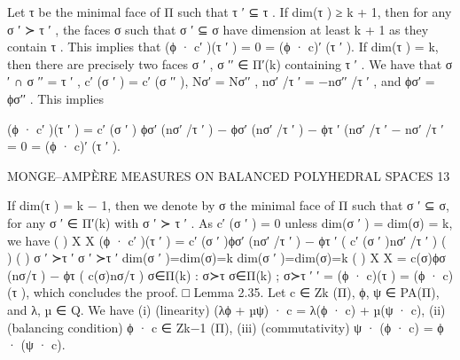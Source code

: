 \documentclass[
  11pt,
]{article}
\newenvironment{Shaded}{}{}
\newcommand{\NormalTok}[1]{#1}
\begin{document}
\begin{Shaded}
\begin{Highlighting}[]
\NormalTok{Let τ be the minimal face of Π such that τ ′ ⊆ τ . If dim(τ ) ≥ k + 1, then for any σ ′ ≻ τ ′ , the}
\NormalTok{faces σ such that σ ′ ⊆ σ have dimension at least k + 1 as they contain τ . This implies that}
\NormalTok{(ϕ · c′ )(τ ′ ) = 0 = (ϕ · c)′ (τ ′ ).}
\NormalTok{    If dim(τ ) = k, then there are precisely two faces σ ′ , σ ′′ ∈ Π′(k) containing τ ′ . We have that}
\NormalTok{σ ′ ∩ σ ′′ = τ ′ , c′ (σ ′ ) = c′ (σ ′′ ), Nσ′ = Nσ′′ , nσ′ /τ ′ = −nσ′′ /τ ′ , and ϕσ′ = ϕσ′′ . This implies}

\NormalTok{         (ϕ · c′ )(τ ′ ) = c′ (σ ′ ) ϕσ′ (nσ′ /τ ′ ) − ϕσ′ (nσ′ /τ ′ ) − ϕτ ′ (nσ′ /τ ′ − nσ′ /τ ′ = 0 = (ϕ · c)′ (τ ′ ).}
                                                                                                  

\NormalTok{                      MONGE–AMPÈRE MEASURES ON BALANCED POLYHEDRAL SPACES                                                    13}


\NormalTok{   If dim(τ ) = k − 1, then we denote by σ the minimal face of Π such that σ ′ ⊆ σ, for any σ ′ ∈ Π′(k)}
\NormalTok{with σ ′ ≻ τ ′ . As c′ (σ ′ ) = 0 unless dim(σ ′ ) = dim(σ) = k, we have}
\NormalTok{                                                                  (                        )}
\NormalTok{                                    X                                                        X}
\NormalTok{         (ϕ · c′ )(τ ′ ) =                        c′ (σ ′ )ϕσ′ (nσ′ /τ ′ ) − ϕτ ′ (                     c′ (σ ′ )nσ′ /τ ′ )}
\NormalTok{                                                                                  (                                       )}
\NormalTok{                                                                                  (                                       )}
\NormalTok{                                     σ ′ ≻τ ′                                              σ ′ ≻τ ′}
\NormalTok{                             dim(σ ′ )=dim(σ)=k                                    dim(σ ′ )=dim(σ)=k}
\NormalTok{                                                                      (                          )}
\NormalTok{                                 X                                           X}
\NormalTok{                       =                    c(σ)ϕσ (nσ/τ ) − ϕτ (                      c(σ)nσ/τ )}
\NormalTok{                             σ∈Π(k) : σ≻τ                               σ∈Π(k) ; σ≻τ}
\NormalTok{                                                     ′   ′}
\NormalTok{                       = (ϕ · c)(τ ) = (ϕ · c) (τ ),}
\NormalTok{which concludes the proof.                                                                                                    □}
\NormalTok{Lemma 2.35. Let c ∈ Zk (Π), ϕ, ψ ∈ PA(Π), and λ, µ ∈ Q. We have}
\NormalTok{    (i) (linearity) (λϕ + µψ) · c = λ(ϕ · c) + µ(ψ · c),}
\NormalTok{   (ii) (balancing condition) ϕ · c ∈ Zk−1 (Π),}
\NormalTok{  (iii) (commutativity) ψ · (ϕ · c) = ϕ · (ψ · c).}


\end{Highlighting}
\end{Shaded}
\end{document}
